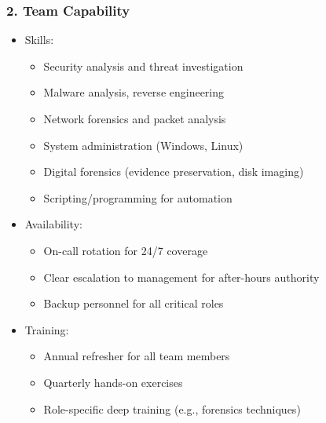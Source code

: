 \documentclass[10pt]{article}
\begin{document}
\subsubsection*{2. Team Capability}
\begin{itemize}
  \item Skills:
  \begin{itemize}
  	\item Security analysis and threat investigation
  	\item Malware analysis, reverse engineering
  	\item Network forensics and packet analysis
  	\item System administration (Windows, Linux)
  	\item Digital forensics (evidence preservation, disk imaging)
  	\item Scripting/programming for automation
  \end{itemize}
  \item Availability:
  \begin{itemize}
  	\item On-call rotation for 24/7 coverage
  	\item Clear escalation to management for after-hours authority
  	\item Backup personnel for all critical roles
  \end{itemize}
  \item Training:
  \begin{itemize}
  	\item Annual refresher for all team members
  	\item Quarterly hands-on exercises
  	\item Role-specific deep training (e.g., forensics techniques)
  \end{itemize}
\end{itemize}
\end{document}
